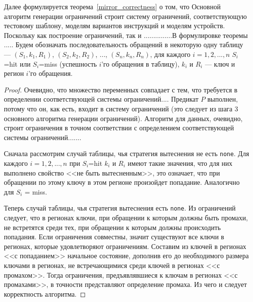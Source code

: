 \begin{enumerate}
Далее формулируется теорема~\ref{mirror_correctness} о том, что Основной алгоритм генерации ограничений строит систему ограничений, соответствующую тестовому шаблону, моделям вариантов инструкций и моделям устройств. Поскольку как построение ограничений, так и ...............В формулировке теоремы ..... Будем обозначать последовательность обращений в некоторую одну таблицу --- $(S_1, k_1, R_1)$, $(S_2, k_2, R_2)$, ..., $(S_n, k_n, R_n)$, для каждого $i = 1, 2, ..., n$ $S_i${=}hit или $S_i${=}miss (успешность $i$'го обращения в таблицу), $k_i$ и $R_i$ --- ключ и регион $i$'го обращения.

\begin{theorem}\label{mirror_correctness}
\CorrectnessMirror
\end{theorem}
\begin{proof} Очевидно, что множество переменных совпадает с тем, что требуется в определении соответствующей системы ограничений....
  Предикат $P$ выполнен, потому что он, как есть, входит в систему ограничений (это следует из шага 3 основного алгоритма генерации ограничений). Алгоритм для данных, очевидно, строит ограничения в точном соответствии с определением соответствующей системы ограничений.......

  Сначала рассмотрим случай таблицы, чья стратегия вытеснения не есть \texttt{none}. Для каждого $i = 1, 2, ..., n$ при $S_i${=}hit  $k_i$ и $R_i$ имеют такие значения, что для них выполнено свойство <<не быть вытесненным>>, это означает, что при обращении по этому ключу в этом регионе произойдет попадание. Аналогично для $S_i$ = miss.

  Теперь случай таблицы, чья стратегия вытеснения есть \texttt{none}. Из ограничений следует, что в регионах ключи, при обращении к которым должны быть промахи, не встретятся среди тех, при обращении к которым должны происходить попадания. Если ограничения совместны, значит существуют все ключи в регионах, которые удовлетворяют ограничениям. Составим из ключей в регионах <<с попаданием>> начальное состояние, дополнив его до необходимого размера ключами в регионах, не встречающимися среди ключей в регионах <<с промахом>>. Тогда ограничения, предъявлявшиеся к ключам в регионах <<с промахами>>, в точности представляют определение промаха. Из чего и следует корректность алгоритма.
\end{proof}

\begin{theorem}\label{mirror_fullness_none}
\FullnessMirrorNone
\end{theorem}


\end{enumerate}
